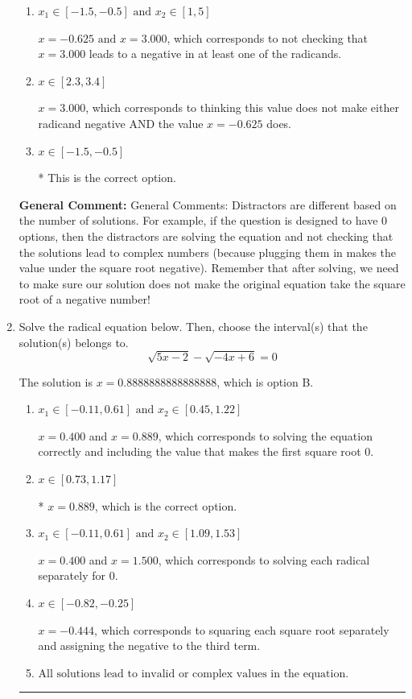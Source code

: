 \documentclass{extbook}[14pt]
\newcommand{\litem}[1]{\item #1

\rule{\textwidth}{0.4pt}}
\begin{document}
\begin{enumerate}
{\begin{enumerate}[label=\Alph*.]
This corresponds to believing both $x = -0.625 \text{ and } x = 3.000$ both lead to complex values.
\item \( x_1 \in [-1.5, -0.5] \text{ and } x_2 \in [1,5] \)

$x = -0.625 \text{ and } x = 3.000$, which corresponds to not checking that $x = 3.000$ leads to a negative in at least one of the radicands.
\item \( x \in [2.3,3.4] \)

$x = 3.000$, which corresponds to thinking this value does not make either radicand negative AND the value $x = -0.625$ does.
\item \( x \in [-1.5,-0.5] \)

* This is the correct option.
\end{enumerate}

\textbf{General Comment:} General Comments: Distractors are different based on the number of solutions. For example, if the question is designed to have 0 options, then the distractors are solving the equation and not checking that the solutions lead to complex numbers (because plugging them in makes the value under the square root negative). Remember that after solving, we need to make sure our solution does not make the original equation take the square root of a negative number!
}
\litem{
Solve the radical equation below. Then, choose the interval(s) that the solution(s) belongs to.
\[ \sqrt{5 x - 2} - \sqrt{-4 x + 6} = 0 \]

The solution is \( x = 0.8888888888888888 \), which is option B.\begin{enumerate}[label=\Alph*.]
\item \( x_1 \in [-0.11, 0.61] \text{ and } x_2 \in [0.45,1.22] \)

$x = 0.400$ and $x = 0.889$, which corresponds to solving the equation correctly and including the value that makes the first square root 0.
\item \( x \in [0.73,1.17] \)

* $x = 0.889$, which is the correct option.
\item \( x_1 \in [-0.11, 0.61] \text{ and } x_2 \in [1.09,1.53] \)

$x = 0.400$ and $x = 1.500$, which corresponds to solving each radical separately for 0.
\item \( x \in [-0.82,-0.25] \)

$x = -0.444$, which corresponds to squaring each square root separately and assigning the negative to the third term.
\item \( \text{All solutions lead to invalid or complex values in the equation.} \)


\end{enumerate}}
\end{enumerate}
\end{document}

